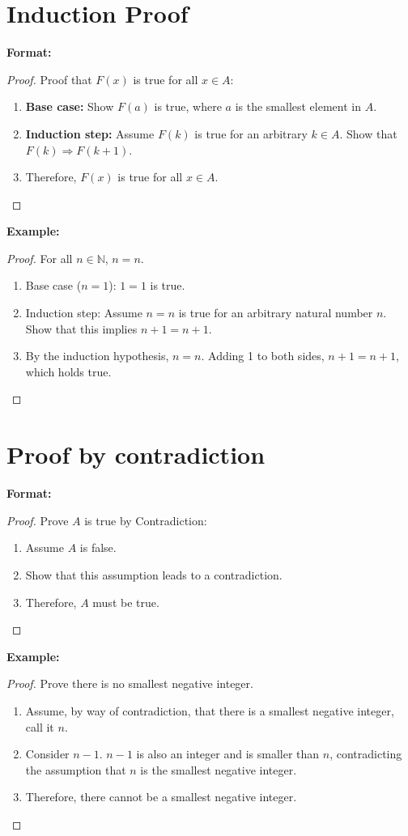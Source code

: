 \section*{Induction Proof}
\textbf{Format:} 
\begin{proof}
Proof that \(F(x)\) is true for all \(x \in A\):
\begin{enumerate}
    \item \textbf{Base case:} Show \(F(a)\) is true, where \(a\) is the smallest element in \(A\).
    \item \textbf{Induction step:} Assume \(F(k)\) is true for an arbitrary \(k \in A\). Show that \(F(k) \Rightarrow F(k+1)\).
    \item Therefore, \(F(x)\) is true for all \(x \in A\).
\end{enumerate}
\end{proof}
\textbf{Example:} 
\begin{proof}
For all \(n \in \mathbb{N}\), \(n = n\).
\begin{enumerate}
    \item Base case (\(n = 1\)): \(1 = 1\) is true.
    \item Induction step: Assume \(n = n\) is true for an arbitrary natural number \(n\). Show that this implies \(n + 1 = n + 1\).
    \item By the induction hypothesis, \(n = n\). Adding 1 to both sides, \(n + 1 = n + 1\), which holds true.
\end{enumerate}
\end{proof}

\section*{Proof by contradiction}
\textbf{Format:}
\begin{proof}
Prove \(A\) is true by Contradiction:
\begin{enumerate}
    \item Assume \(A\) is false.
    \item Show that this assumption leads to a contradiction.
    \item Therefore, \(A\) must be true.
\end{enumerate}
\end{proof}
\textbf{Example:}
\begin{proof}
Prove there is no smallest negative integer.
\begin{enumerate}
    \item Assume, by way of contradiction, that there is a smallest negative integer, call it \(n\).
    \item Consider \(n - 1\). \(n - 1\) is also an integer and is smaller than \(n\), contradicting the assumption that \(n\) is the smallest negative integer.
    \item Therefore, there cannot be a smallest negative integer.
\end{enumerate}
\end{proof}
